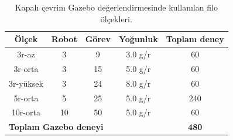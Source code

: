 \begin{table}[h]
\centering
\caption{Kapalı çevrim Gazebo değerlendirmesinde kullanılan filo ölçekleri.}
\label{tab:scales}
\renewcommand{\arraystretch}{1.15}
\begin{tabular}{@{}ccccc@{}}
\toprule
Ölçek & Robot & Görev & Yoğunluk & Toplam deney \\
\midrule
3r-az    & 3 & 9  & 3.0 g/r & 60 \\
3r-orta  & 3 & 15 & 5.0 g/r & 60 \\
3r-yüksek& 3 & 24 & 8.0 g/r & 60 \\
5r-orta  & 5 & 25 & 5.0 g/r & 240 \\
10r-orta & 10 & 50 & 5.0 g/r & 60 \\
\midrule
\multicolumn{4}{l}{\textbf{Toplam Gazebo deneyi}} & \textbf{480} \\
\bottomrule
\end{tabular}
\end{table}
